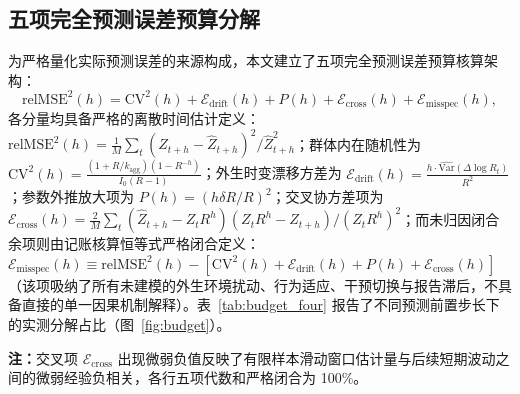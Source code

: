 \documentclass[11pt,a4paper]{article}
\theoremstyle{plain}
\theoremstyle{definition}
\begin{document}
\subsection{五项完全预测误差预算分解}

为严格量化实际预测误差的来源构成，本文建立了五项完全预测误差预算核算架构：
\begin{equation}
\text{relMSE}^2(h) = \text{CV}^2(h) + \mathcal{E}_{\text{drift}}(h) + P(h) + \mathcal{E}_{\text{cross}}(h) + \mathcal{E}_{\text{misspec}}(h),
\label{eq:full_budget}
\end{equation}
各分量均具备严格的离散时间估计定义：$\text{relMSE}^2(h) = \frac{1}{M}\sum_{t} (Z_{t+h} - \hat{Z}_{t+h})^2 / \hat{Z}_{t+h}^2$；群体内在随机性为 $\text{CV}^2(h) = \frac{(1+R/k_{\text{agg}})(1-R^{-h})}{I_0(R-1)}$；外生时变漂移方差为 $\mathcal{E}_{\text{drift}}(h) = \frac{h \cdot \widehat{\text{Var}}(\Delta \log R_t)}{R^2}$；参数外推放大项为 $P(h) = (h \delta R / R)^2$；交叉协方差项为 $\mathcal{E}_{\text{cross}}(h) = \frac{2}{M}\sum_{t} (\hat{Z}_{t+h} - Z_t R^h)(Z_t R^h - Z_{t+h}) / (Z_t R^h)^2$；而未归因闭合余项则由记账核算恒等式严格闭合定义：$\mathcal{E}_{\text{misspec}}(h) \equiv \text{relMSE}^2(h) - [\text{CV}^2(h) + \mathcal{E}_{\text{drift}}(h) + P(h) + \mathcal{E}_{\text{cross}}(h)]$（该项吸纳了所有未建模的外生环境扰动、行为适应、干预切换与报告滞后，不具备直接的单一因果机制解释）。表~\ref{tab:budget_four} 报告了不同预测前置步长下的实测分解占比（图~\ref{fig:budget}）。

\begin{table}[htbp]
\centering
\footnotesize
\caption{美国三大呼吸道传染病真实监测数据五项完全预测误差预算实测分解}
\label{tab:budget_four}
\vspace{2pt}
\begin{flushleft}
\scriptsize \textbf{注：}交叉项 $\mathcal{E}_{\text{cross}}$ 出现微弱负值反映了有限样本滑动窗口估计量与后续短期波动之间的微弱经验负相关，各行五项代数和严格闭合为 100\%。
\end{flushleft}
\end{table}
\end{document}
